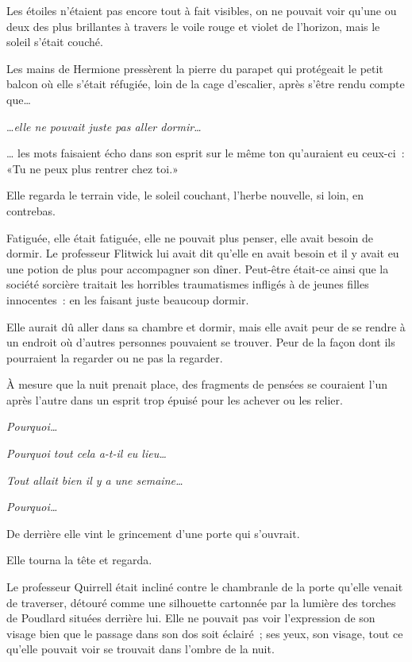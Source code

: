 \later

Les étoiles n'étaient pas encore tout à fait visibles, on ne pouvait voir qu'une ou deux des plus brillantes à travers le voile rouge et violet de l'horizon, mais le soleil s'était couché.

Les mains de Hermione pressèrent la pierre du parapet qui protégeait le petit balcon où elle s'était réfugiée, loin de la cage d'escalier, après s'être rendu compte que…

…\emph{elle ne pouvait juste pas aller dormir…}

… les mots faisaient écho dans son esprit sur le même ton qu'auraient eu ceux-ci~: «Tu ne peux plus rentrer chez toi.»

Elle regarda le terrain vide, le soleil couchant, l'herbe nouvelle, si loin, en contrebas.

Fatiguée, elle était fatiguée, elle ne pouvait plus penser, elle avait besoin de dormir. Le professeur Flitwick lui avait dit qu'elle en avait besoin et il y avait eu une potion de plus pour accompagner son dîner. Peut-être était-ce ainsi que la société sorcière traitait les horribles traumatismes infligés à de jeunes filles innocentes~: en les faisant juste beaucoup dormir.

Elle aurait dû aller dans sa chambre et dormir, mais elle avait peur de se rendre à un endroit où d'autres personnes pouvaient se trouver. Peur de la façon dont ils pourraient la regarder ou ne pas la regarder.

À mesure que la nuit prenait place, des fragments de pensées se couraient l'un après l'autre dans un esprit trop épuisé pour les achever ou les relier.

\emph{Pourquoi…}

\emph{Pourquoi tout cela a-t-il eu lieu…}

\emph{Tout allait bien il y a une semaine…}

\emph{Pourquoi…}

De derrière elle vint le grincement d'une porte qui s'ouvrait.

Elle tourna la tête et regarda.

Le professeur Quirrell était incliné contre le chambranle de la porte qu'elle venait de traverser, détouré comme une silhouette cartonnée par la lumière des torches de Poudlard situées derrière lui. Elle ne pouvait pas voir l'expression de son visage bien que le passage dans son dos soit éclairé~; ses yeux, son visage, tout ce qu'elle pouvait voir se trouvait dans l'ombre de la nuit.

